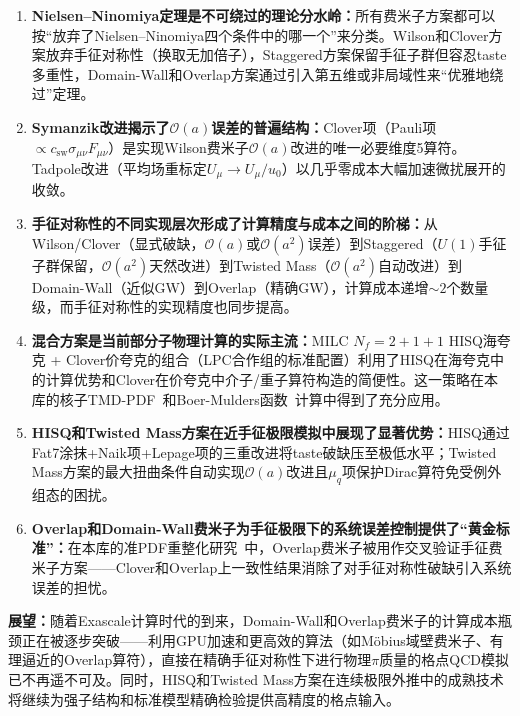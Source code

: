 \documentclass[12pt,a4paper]{ctexart}
\theoremstyle{definition}
\begin{document}
\begin{enumerate}[leftmargin=*]

    \item \textbf{Nielsen--Ninomiya定理是不可绕过的理论分水岭：}所有费米子方案都可以按``放弃了Nielsen--Ninomiya四个条件中的哪一个''来分类。Wilson和Clover方案放弃手征对称性（换取无加倍子），Staggered方案保留手征子群但容忍taste多重性，Domain-Wall和Overlap方案通过引入第五维或非局域性来``优雅地绕过''定理。

    \item \textbf{Symanzik改进揭示了$\mathcal{O}(a)$误差的普遍结构：}Clover项（Pauli项$\propto c_{\text{sw}}\sigma_{\mu\nu}F_{\mu\nu}$）是实现Wilson费米子$\mathcal{O}(a)$改进的唯一必要维度5算符。Tadpole改进（平均场重标定$U_\mu \to U_\mu/u_0$）以几乎零成本大幅加速微扰展开的收敛。

    \item \textbf{手征对称性的不同实现层次形成了计算精度与成本之间的阶梯：}从Wilson/Clover（显式破缺，$\mathcal{O}(a)$或$\mathcal{O}(a^2)$误差）到Staggered（$U(1)$手征子群保留，$\mathcal{O}(a^2)$天然改进）到Twisted Mass（$\mathcal{O}(a^2)$自动改进）到Domain-Wall（近似GW）到Overlap（精确GW），计算成本递增$\sim\!2$个数量级，而手征对称性的实现精度也同步提高。

    \item \textbf{混合方案是当前部分子物理计算的实际主流：}MILC $N_f=2+1+1$ HISQ海夸克 + Clover价夸克的组合（LPC合作组的标准配置）利用了HISQ在海夸克中的计算优势和Clover在价夸克中介子/重子算符构造的简便性。这一策略在本库的核子TMD-PDF~\cite{He2024unpolTMD}和Boer-Mulders函数~\cite{Ma2025BoerMulders}计算中得到了充分应用。

    \item \textbf{HISQ和Twisted Mass方案在近手征极限模拟中展现了显著优势：}HISQ通过Fat7涂抹+Naik项+Lepage项的三重改进将taste破缺压至极低水平；Twisted Mass方案的最大扭曲条件自动实现$\mathcal{O}(a)$改进且$\mu_q$项保护Dirac算符免受例外组态的困扰。

    \item \textbf{Overlap和Domain-Wall费米子为手征极限下的系统误差控制提供了``黄金标准''：}在本库的准PDF重整化研究~\cite{Huo2021self}中，Overlap费米子被用作交叉验证手征费米子方案——Clover和Overlap上一致性结果消除了对手征对称性破缺引入系统误差的担忧。

\end{enumerate}

\textbf{展望：}随着Exascale计算时代的到来，Domain-Wall和Overlap费米子的计算成本瓶颈正在被逐步突破——利用GPU加速和更高效的算法（如M\"obius域壁费米子、有理逼近的Overlap算符），直接在精确手征对称性下进行物理$\pi$质量的格点QCD模拟已不再遥不可及。同时，HISQ和Twisted Mass方案在连续极限外推中的成熟技术将继续为强子结构和标准模型精确检验提供高精度的格点输入。
\end{document}
